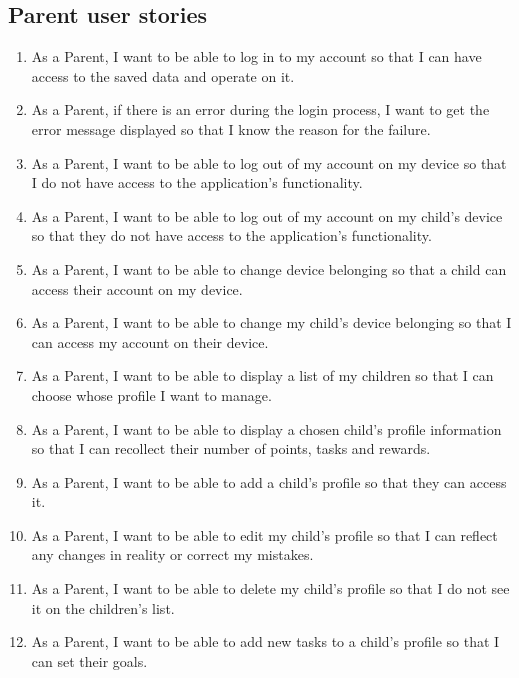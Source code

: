\subsection{Parent user stories}\label{subsec:requirements:functional:parent}
\begin{enumerate}[label=FR \arabic*.,leftmargin=3\parindent, start=4]
\item\label{fr:parent:login} As a Parent, I want to be able to log in to my account so that I can have access to the saved data and operate on it.
\item\label{fr:parent:login-error} As a Parent, if there is an error during the login process, I want to get the error message displayed so that I know the reason for the failure.
\item\label{fr:parent:logout-parent} As a Parent, I want to be able to log out of my account on my device so that I do not have access to the application's functionality.
\item\label{fr:parent:logout-child} As a Parent, I want to be able to log out of my account on my child's device so that they do not have access to the application's functionality.
\item\label{fr:parent:belonging-parent} As a Parent, I want to be able to change device belonging so that a child can access their account on my device.
\item\label{fr:parent:belonging-child} As a Parent, I want to be able to change my child's device belonging so that I can access my account on their device.
\item\label{fr:parent:children-list} As a Parent, I want to be able to display a list of my children so that I can choose whose profile I want to manage.
\item\label{fr:parent:children-profile} As a Parent, I want to be able to display a chosen child's profile information so that I can recollect their number of points, tasks and rewards.
\item\label{fr:parent:children-add} As a Parent, I want to be able to add a child's profile so that they can access it.
\item\label{fr:parent:children-edit} As a Parent, I want to be able to edit my child's profile so that I can reflect any changes in reality or correct my mistakes.
\item\label{fr:parent:children-delete} As a Parent, I want to be able to delete my child's profile so that I do not see it on the children's list.
\item\label{fr:parent:tasks-add} As a Parent, I want to be able to add new tasks to a child's profile so that I can set their goals.

\end{enumerate}
